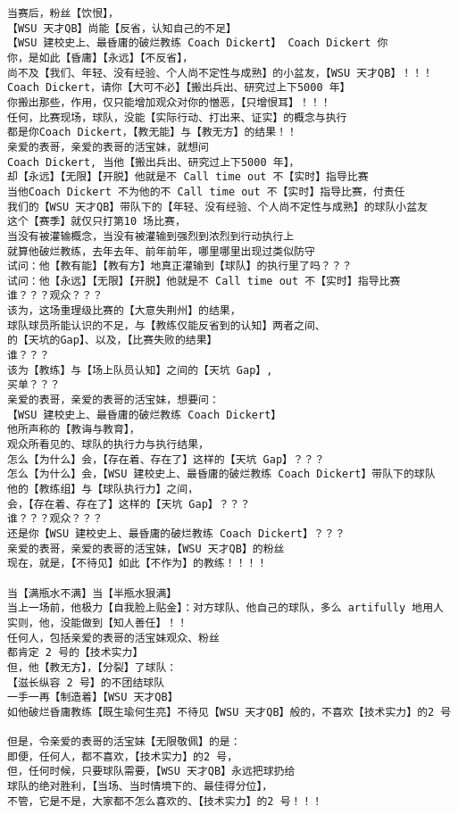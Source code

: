 \documentclass[9pt, b5paper]{article}
\begin{document}
\begin{verbatim}
当赛后，粉丝【饮恨】，
【WSU 天才QB】尚能【反省，认知自己的不足】
【WSU 建校史上、最昏庸的破烂教练 Coach Dickert】 Coach Dickert 你
你，是如此【昏庸】【永远】【不反省】，
尚不及【我们、年轻、没有经验、个人尚不定性与成熟】的小盆友，【WSU 天才QB】！！！
Coach Dickert，请你【大可不必】【搬出兵出、研究过上下5000 年】
你搬出那些，作用，仅只能增加观众对你的憎恶，【只增恨耳】！！！
任何，比赛现场，球队，没能【实际行动、打出来、证实】的概念与执行
都是你Coach Dickert，【教无能】与【教无方】的结果！！
亲爱的表哥，亲爱的表哥的活宝妹，就想问
Coach Dickert, 当他【搬出兵出、研究过上下5000 年】，
却【永远】【无限】【开脱】他就是不 Call time out 不【实时】指导比赛
当他Coach Dickert 不为他的不 Call time out 不【实时】指导比赛，付责任
我们的【WSU 天才QB】带队下的【年轻、没有经验、个人尚不定性与成熟】的球队小盆友
这个【赛季】就仅只打第10 场比赛，
当没有被灌输概念，当没有被灌输到强烈到浓烈到行动执行上
就算他破烂教练，去年去年、前年前年，哪里哪里出现过类似防守
试问：他【教有能】【教有方】地真正灌输到【球队】的执行里了吗？？？
试问：他【永远】【无限】【开脱】他就是不 Call time out 不【实时】指导比赛
谁？？？观众？？？
该为，这场重理级比赛的【大意失荆州】的结果，
球队球员所能认识的不足，与【教练仅能反省到的认知】两者之间、
的【天坑的Gap】、以及，【比赛失败的结果】
谁？？？
该为【教练】与【场上队员认知】之间的【天坑 Gap】,
买单？？？
亲爱的表哥，亲爱的表哥的活宝妹，想要问：
【WSU 建校史上、最昏庸的破烂教练 Coach Dickert】
他所声称的【教诲与教育】，
观众所看见的、球队的执行力与执行结果，
怎么【为什么】会，【存在着、存在了】这样的【天坑 Gap】？？？
怎么【为什么】会，【WSU 建校史上、最昏庸的破烂教练 Coach Dickert】带队下的球队
他的【教练组】与【球队执行力】之间，
会，【存在着、存在了】这样的【天坑 Gap】？？？
谁？？？观众？？？
还是你【WSU 建校史上、最昏庸的破烂教练 Coach Dickert】？？？
亲爱的表哥，亲爱的表哥的活宝妹，【WSU 天才QB】的粉丝
现在，就是，【不待见】如此【不作为】的教练！！！！

当【满瓶水不满】当【半瓶水狠满】
当上一场前，他极力【自我脸上贴金】：对方球队、他自己的球队，多么 artifully 地用人
实则，他，没能做到【知人善任】！！
任何人，包括亲爱的表哥的活宝妹观众、粉丝
都肯定 2 号的【技术实力】
但，他【教无方】，【分裂】了球队：
【滋长纵容 2 号】的不团结球队
一手一再【制造着】【WSU 天才QB】
如他破烂昏庸教练【既生瑜何生亮】不待见【WSU 天才QB】般的，不喜欢【技术实力】的2 号

但是，令亲爱的表哥的活宝妹【无限敬佩】的是：
即便，任何人，都不喜欢，【技术实力】的2 号，
但，任何时候，只要球队需要，【WSU 天才QB】永远把球扔给
球队的绝对胜利，【当场、当时情境下的、最佳得分位】，
不管，它是不是，大家都不怎么喜欢的、【技术实力】的2 号！！！


\end{verbatim}
\end{document}
